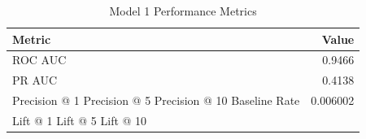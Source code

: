 \begin{table}[h]
\centering
\begin{tabular}{lr}
\toprule
Metric & Value \\
\midrule
ROC AUC & 0.9466 \\
PR AUC & 0.4138 \\
Precision @ 1%
Precision @ 5%
Precision @ 10%
Baseline Rate & 0.006002 \\
Lift @ 1%
Lift @ 5%
Lift @ 10%
\bottomrule
\end{tabular}
\caption{Model 1 Performance Metrics}
\label{tab:model1_metrics}
\end{table}
